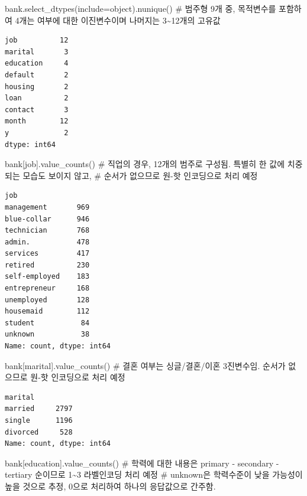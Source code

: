 \documentclass[
  a4paper,
  DIV=11,
  numbers=noendperiod]{scrreprt}
\newenvironment{Shaded}{\begin{snugshade}}{\end{snugshade}}
\newcommand{\CommentTok}[1]{\textcolor[rgb]{0.37,0.37,0.37}{#1}}
\newcommand{\NormalTok}[1]{\textcolor[rgb]{0.00,0.23,0.31}{#1}}
\newcommand{\OperatorTok}[1]{\textcolor[rgb]{0.37,0.37,0.37}{#1}}
\newcommand{\StringTok}[1]{\textcolor[rgb]{0.13,0.47,0.30}{#1}}
\begin{document}
\begin{Shaded}
\begin{Highlighting}[]
\NormalTok{bank.select\_dtypes(include}\OperatorTok{=}\StringTok{\textquotesingle{}object\textquotesingle{}}\NormalTok{).nunique()}
\CommentTok{\# 범주형 9개 중, 목적변수를 포함하여 4개는 \textquotesingle{}여부\textquotesingle{}에 대한 이진변수이며 나머지는 3\textasciitilde{}12개의 고유값}
\end{Highlighting}
\end{Shaded}

\begin{verbatim}
job          12
marital       3
education     4
default       2
housing       2
loan          2
contact       3
month        12
y             2
dtype: int64
\end{verbatim}

\begin{Shaded}
\begin{Highlighting}[]
\NormalTok{bank[}\StringTok{\textquotesingle{}job\textquotesingle{}}\NormalTok{].value\_counts()}
\CommentTok{\# 직업의 경우, 12개의 범주로 구성됨. 특별히 한 값에 치중되는 모습도 보이지 않고,}
\CommentTok{\# 순서가 없으므로 원{-}핫 인코딩으로 처리 예정}
\end{Highlighting}
\end{Shaded}

\begin{verbatim}
job
management       969
blue-collar      946
technician       768
admin.           478
services         417
retired          230
self-employed    183
entrepreneur     168
unemployed       128
housemaid        112
student           84
unknown           38
Name: count, dtype: int64
\end{verbatim}

\begin{Shaded}
\begin{Highlighting}[]
\NormalTok{bank[}\StringTok{\textquotesingle{}marital\textquotesingle{}}\NormalTok{].value\_counts()}
\CommentTok{\# 결혼 여부는 싱글/결혼/이혼 3진변수임. 순서가 없으므로 원{-}핫 인코딩으로 처리 예정}
\end{Highlighting}
\end{Shaded}

\begin{verbatim}
marital
married     2797
single      1196
divorced     528
Name: count, dtype: int64
\end{verbatim}

\begin{Shaded}
\begin{Highlighting}[]
\NormalTok{bank[}\StringTok{\textquotesingle{}education\textquotesingle{}}\NormalTok{].value\_counts()}
\CommentTok{\# 학력에 대한 내용은 primary {-} secondary {-} tertiary 순이므로 1\textasciitilde{}3 라벨인코딩 처리 예정}
\CommentTok{\# unknown은 학력수준이 낮을 가능성이 높을 것으로 추정, 0으로 처리하여 하나의 응답값으로 간주함.}
\end{Highlighting}
\end{Shaded}
\end{document}

